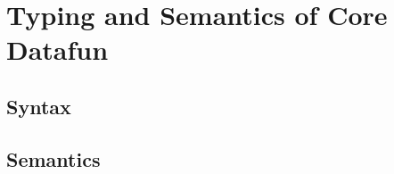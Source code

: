 \section{Typing and Semantics of Core Datafun}
\label{sec:typing-and-semantics}

\subsection{Syntax}




\subsection{Semantics }